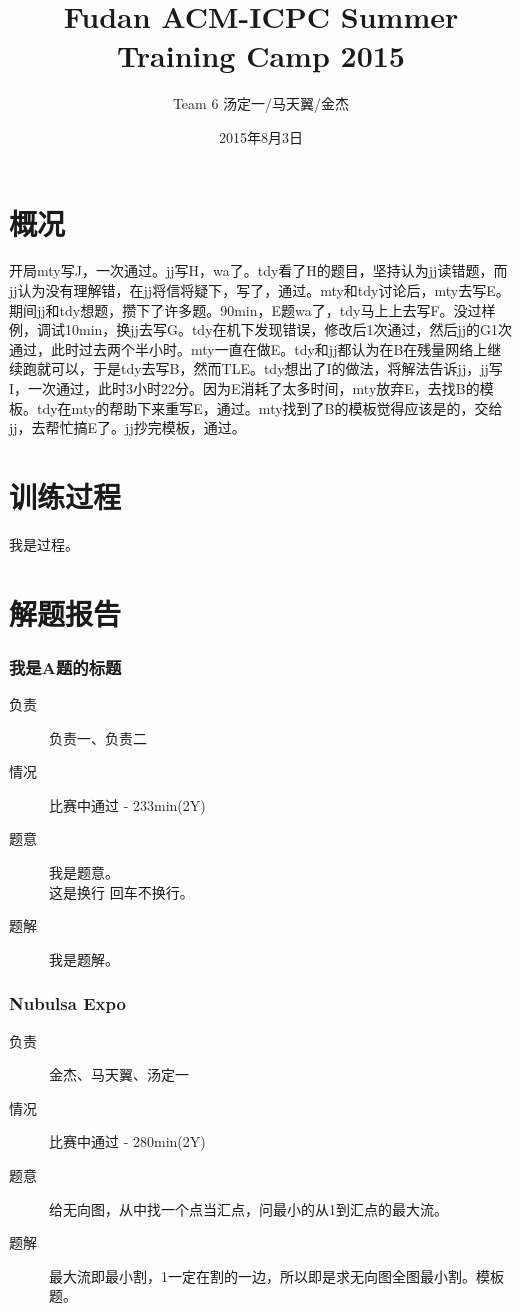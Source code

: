 \documentclass[a4paper, 11pt, nofonts, nocap, fancyhdr]{ctexart}
\title{Fudan ACM-ICPC Summer Training Camp 2015}
\author{Team 6 汤定一/马天翼/金杰}
\date{2015年8月3日}
\newcommand{\problem}[1]{\subsubsection{#1}}
\begin{document}
\maketitle

\section{概况}

开局mty写J，一次通过。jj写H，wa了。tdy看了H的题目，坚持认为jj读错题，而jj认为没有理解错，在jj将信将疑下，写了，通过。mty和tdy讨论后，mty去写E。期间jj和tdy想题，攒下了许多题。90min，E题wa了，tdy马上上去写F。没过样例，调试10min，换jj去写G。tdy在机下发现错误，修改后1次通过，然后jj的G1次通过，此时过去两个半小时。mty一直在做E。tdy和jj都认为在B在残量网络上继续跑就可以，于是tdy去写B，然而TLE。tdy想出了I的做法，将解法告诉jj，jj写I，一次通过，此时3小时22分。因为E消耗了太多时间，mty放弃E，去找B的模板。tdy在mty的帮助下来重写E，通过。mty找到了B的模板觉得应该是的，交给jj，去帮忙搞E了。jj抄完模板，通过。

\section{训练过程}

我是过程。

\section{解题报告}

\problem{我是A题的标题}

\begin{description}
\item[负责] 负责一、负责二
\item[情况] 比赛中通过 - 233min(2Y)
\item[题意]
我是题意。\\这是换行
回车不换行。
\item[题解]
我是题解。
\end{description}

\problem{Nubulsa Expo}

\begin{description}
\item[负责] 金杰、马天翼、汤定一
\item[情况] 比赛中通过 - 280min(2Y)
\item[题意]
给无向图，从中找一个点当汇点，问最小的从1到汇点的最大流。
\item[题解]
最大流即最小割，1一定在割的一边，所以即是求无向图全图最小割。模板题。
\end{description}
\end{document}
